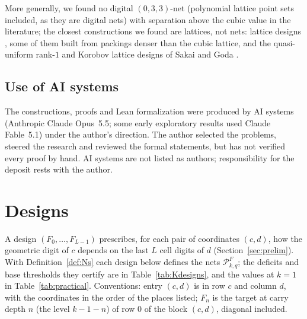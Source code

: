 \documentclass[11pt]{amsart}
\theoremstyle{definition}
\theoremstyle{plain}
\begin{document}
More generally, we found no digital $(0,3,3)$-net (polynomial lattice point sets included, as they are digital nets) with separation above the cubic value in the literature; the closest constructions we found are lattices, not nets: lattice designs \cite{He17,He21}, some of them built from packings denser than the cubic lattice, and the quasi-uniform rank-$1$ and Korobov lattice designs of Sakai and Goda \cite{SG26}.

\subsection*{Use of AI systems}
The constructions, proofs and Lean formalization were produced by AI systems (Anthropic Claude Opus~5.5; some early exploratory results used Claude Fable~5.1) under the author's direction. The author selected the problems, steered the research and reviewed the formal statements, but has not verified every proof by hand. AI systems are not listed as authors; responsibility for the deposit rests with the author.

\appendix

\section{Designs}\label{app:designs}
A design $(F_0,\dots,F_{L-1})$ prescribes, for each pair of coordinates $(c,d)$, how the geometric digit of $c$ depends on the last $L$ cell digits of $d$ (Section~\ref{sec:prelim}). With Definition~\ref{def:Ns} each design below defines the nets $\mathcal P^F_{k,q}$; the deficits and base thresholds they certify are in Table~\ref{tab:Kdesigns}, and the values at $k=1$ in Table~\ref{tab:practical}. Conventions: entry $(c,d)$ is in row $c$ and column $d$, with the coordinates in the order of the places listed; $F_n$ is the target at carry depth $n$ (the level $k-1-n$) of row $0$ of the block $(c,d)$, diagonal included.
\end{document}

